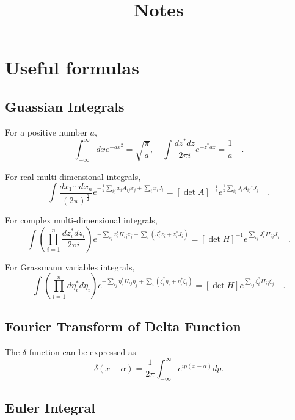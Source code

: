 \documentclass{book}
\title{Notes}
\date{}
\numberwithin{equation}{section}
\begin{document}
\tableofcontents

\chapter{Useful formulas}
\section{Guassian Integrals}
For a positive number $a$,
\begin{equation}
  \int_{-\infty}^\infty dx e^{-ax^2}=\sqrt{\frac{\pi}{a}},\quad
  \int\frac{dz^*dz}{2\pi i}e^{-z^*az}=\frac{1}{a}\quad.
\end{equation}

For real multi-dimensional integrals,
\begin{equation}
  \int\frac{dx_1\cdots dx_n}{(2\pi)^{\frac{n}{2}}}
  e^{-\frac{1}{2}\sum_{ij}x_iA_{ij}x_j+\sum_ix_iJ_i}=
  [\det A]^{-\frac{1}{2}}e^{\frac{1}{2}\sum_{ij}J_iA^{-1}_{ij}J_j}\quad.
\end{equation}

For complex multi-dimensional integrals,
\begin{equation}
  \int\left(\prod_{i=1}^n\frac{dz_i^*dz_i}{2\pi i}\right)
  e^{-\sum_{ij}z_i^*H_{ij}z_j+\sum_i(J^*_iz_i+z_i^*J_i)}=
  [\det H]^{-1}e^{\sum_{ij}J_i^*H_{ij}J_j}\quad.
\end{equation}

For Grassmann variables integrals,
\begin{equation}
  \int\left(\prod_{i=1}^n d\eta_i^*d\eta_i\right)
  e^{-\sum_{ij}\eta_i^*H_{ij}\eta_j+\sum_i(\xi_i^*\eta_i+\eta_i^*\xi_i)}
  =[\det H]e^{\sum_{ij}\xi_i^*H_{ij}\xi_j}\quad.
\end{equation}

\section{Fourier Transform of Delta Function}
The $\delta$ function can be expressed as
\begin{equation}
  \delta(x-\alpha)=\frac{1}{2\pi}\int_{-\infty}^\infty e^{ip(x-\alpha)}dp.
\end{equation}
\section{Euler Integral}
\end{document}
